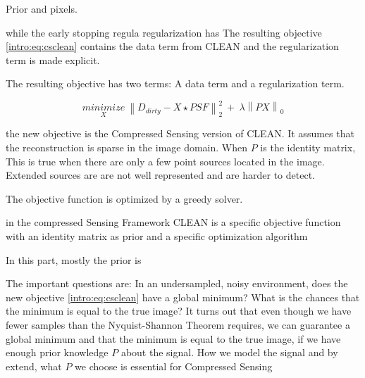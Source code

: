 Prior and pixels.


while the early stopping regula regularization has The resulting objective \eqref{intro:eq:csclean} contains the data term from CLEAN and the regularization term is made explicit.  

 
 The resulting objective has two terms: A data term and a regularization term. 

\begin{equation}\label{intro:eq:csclean}
\underset{X}{minimize} \: \left \| D_{dirty} -X \star PSF \right \|_2^2 \: + \: \lambda \left \| PX \right \|_0
\end{equation}

 the new objective is the Compressed Sensing version of CLEAN. It assumes that the reconstruction is sparse in the image domain. When $P$ is the identity matrix, This is true when there are only a few point sources located in the image. Extended sources are are not well represented and are harder to detect. 
 
 The objective function is optimized by a greedy solver. 

in the compressed Sensing Framework CLEAN is
a specific objective function
with an identity matrix as prior
and a specific optimization algorithm

In this part, mostly the prior is 

The important questions are: In an undersampled, noisy environment, does the new objective \eqref{intro:eq:csclean} have a global minimum? What is the chances that the minimum is equal to the true image? It turns out that even though we have fewer samples than the Nyquist-Shannon Theorem requires, we can guarantee a global minimum and that the minimum is equal to the true image, if we have enough prior knowledge $P$ about the signal. How we model the signal and by extend, what $P$ we choose is essential for Compressed Sensing



